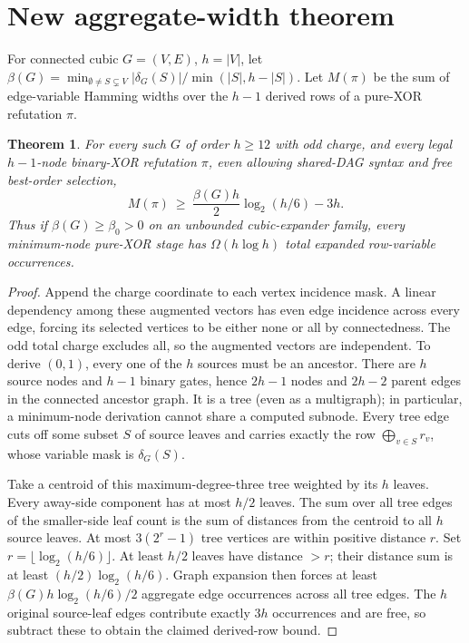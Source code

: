 \documentclass[11pt]{article}
\newtheorem{theorem}{Theorem}
\begin{document}
\section*{New aggregate-width theorem}
For connected cubic \(G=(V,E)\), \(h=|V|\), let \(\beta(G)=\min_{\emptyset\ne S\subsetneq V} |\delta_G(S)|/\min(|S|,h-|S|)\). Let \(M(\pi)\) be the sum of edge-variable Hamming widths over the \(h-1\) derived rows of a pure-XOR refutation \(\pi\).
\begin{theorem}
For every such \(G\) of order \(h\ge12\) with odd charge, and every legal \(h-1\)-node binary-XOR refutation \(\pi\), even allowing shared-DAG syntax and free best-order selection,
\[
\boxed{M(\pi)\ \ge\ \frac{\beta(G)h}{2}\log_2(h/6)-3h.}
\]
Thus if \(\beta(G)\ge\beta_0>0\) on an unbounded cubic-expander family, every minimum-node pure-XOR stage has \(\Omega(h\log h)\) total \emph{expanded} row-variable occurrences.
\end{theorem}
\begin{proof}
Append the charge coordinate to each vertex incidence mask. A linear dependency among these augmented vectors has even edge incidence across every edge, forcing its selected vertices to be either none or all by connectedness. The odd total charge excludes all, so the augmented vectors are independent. To derive \((0,1)\), every one of the \(h\) sources must be an ancestor. There are \(h\) source nodes and \(h-1\) binary gates, hence \(2h-1\) nodes and \(2h-2\) parent edges in the connected ancestor graph. It is a tree (even as a multigraph); in particular, a minimum-node derivation cannot share a computed subnode. Every tree edge cuts off some subset \(S\) of source leaves and carries exactly the row \(\bigoplus_{v\in S}r_v\), whose variable mask is \(\delta_G(S)\).

Take a centroid of this maximum-degree-three tree weighted by its \(h\) leaves. Every away-side component has at most \(h/2\) leaves. The sum over all tree edges of the smaller-side leaf count is the sum of distances from the centroid to all \(h\) source leaves. At most \(3(2^r-1)\) tree vertices are within positive distance \(r\). Set \(r=\lfloor\log_2(h/6)\rfloor\). At least \(h/2\) leaves have distance \(>r\); their distance sum is at least \((h/2)\log_2(h/6)\). Graph expansion then forces at least \(\beta(G)h\log_2(h/6)/2\) aggregate edge occurrences across all tree edges. The \(h\) original source-leaf edges contribute exactly \(3h\) occurrences and are free, so subtract these to obtain the claimed derived-row bound.
\end{proof}
\end{document}
